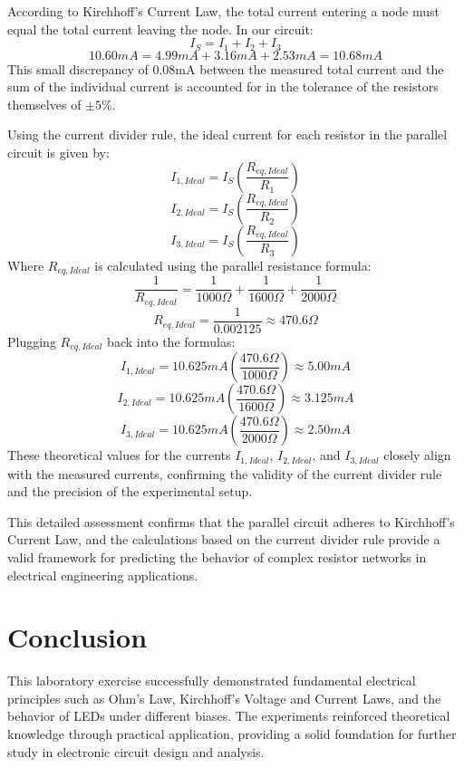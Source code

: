 \documentclass[12pt]{article}
\begin{document}
According to Kirchhoff’s Current Law, the total current entering a node must equal the total current leaving the node. In our circuit:
\[
	I_S = I_1 + I_2 + I_3
\]
\[
	10.60mA = 4.99mA + 3.16mA + 2.53mA = 10.68mA
\]
This small discrepancy of 0.08mA between the measured total current and the sum
of the individual current is accounted for in the tolerance of the resistors
themselves of \(\pm 5\%\).

Using the current divider rule, the ideal current for each resistor in the
parallel circuit is given by: \[
	I_{1, Ideal} = I_S \left(\frac{R_{eq, Ideal}}{R_1}\right)
\]
\[
	I_{2, Ideal} = I_S \left(\frac{R_{eq, Ideal}}{R_2}\right)
\]
\[
	I_{3, Ideal} = I_S \left(\frac{R_{eq, Ideal}}{R_3}\right)
\]
Where \( R_{eq, Ideal} \) is calculated using the parallel resistance formula:
\[
	\frac{1}{R_{eq, Ideal}} = \frac{1}{1000\Omega} + \frac{1}{1600\Omega} + \frac{1}{2000\Omega}
\]
\[
	R_{eq, Ideal} = \frac{1}{0.002125} \approx 470.6\Omega
\]
Plugging \( R_{eq, Ideal} \) back into the formulas:
\[
	I_{1, Ideal} = 10.625mA \left(\frac{470.6\Omega}{1000\Omega}\right) \approx 5.00mA
\]
\[
	I_{2, Ideal} = 10.625mA \left(\frac{470.6\Omega}{1600\Omega}\right) \approx 3.125mA
\]
\[
	I_{3, Ideal} = 10.625mA \left(\frac{470.6\Omega}{2000\Omega}\right) \approx 2.50mA
\]
These theoretical values for the currents \(I_{1, Ideal}\), \(I_{2, Ideal}\), and \(I_{3, Ideal}\) closely align with the measured currents, confirming the validity of the current divider rule and the precision of the experimental setup.

This detailed assessment confirms that the parallel circuit adheres to Kirchhoff's Current Law, and the calculations based on the current divider rule provide a valid framework for predicting the behavior of complex resistor networks in electrical engineering applications.

\section*{Conclusion}
This laboratory exercise successfully demonstrated fundamental electrical principles such as Ohm's Law, Kirchhoff's Voltage and Current Laws, and the behavior of LEDs under different biases. The experiments reinforced theoretical knowledge through practical application, providing a solid foundation for further study in electronic circuit design and analysis.
\end{document}
